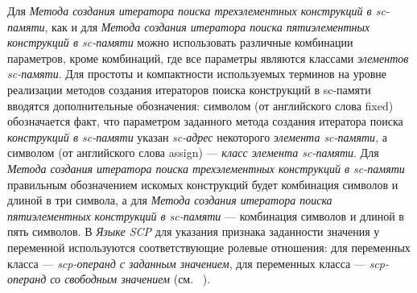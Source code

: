 Для \textit{Метода создания итератора поиска трехэлементных конструкций в sc-памяти}, как и для \textit{Метода создания итератора поиска пятиэлементных конструкций в sc-памяти} можно использовать различные комбинации параметров, кроме комбинаций, где все параметры являются классами \textit{элементов sc-памяти}. Для простоты и компактности используемых терминов на уровне реализации методов создания итераторов поиска конструкций в sc-памяти вводятся дополнительные обозначения: символом  (от английского слова fixed) обозначается факт, что параметром заданного метода создания итератора поиска \textit{конструкций в sc-памяти} указан \textit{sc-адрес} некоторого \textit{элемента sc-памяти}, а символом  (от английского слова assign) --- \textit{класс элемента sc-памяти}\scnsupergroupsign. Для \textit{Метода создания итератора поиска трехэлементных конструкций в sc-памяти} правильным обозначением искомых конструкций будет комбинация символов  и  длиной в три символа, а для \textit{Метода создания итератора поиска пятиэлементных конструкций в sc-памяти} --- комбинация символов  и  длиной в пять символов. В \textit{Языке SCP} для указания признака заданности значения у переменной используются соответствующие ролевые отношения: для переменных класса  ---  \textit{scp-операнд с заданным значением\scnrolesign}, для переменных класса  --- \textit{scp-операнд со свободным значением\scnrolesign} (см. ~).

